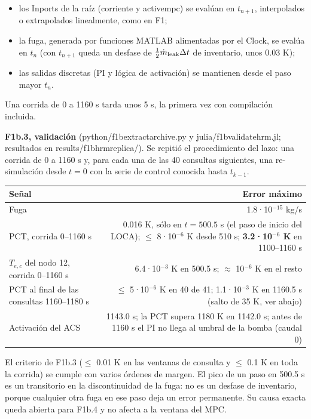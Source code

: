 \documentclass[11pt,a4paper]{article}
\newcommand{\codeus}{\textunderscore\allowbreak}
\newcommand{\code}[1]{{\small\ttfamily\let\_\codeus #1}}
\begin{document}
\begin{itemize}
\item los Inports de la raíz (corriente y \code{active\_mpc}) se evalúan en $t_{n+1}$, interpolados o extrapolados linealmente, como en F1;
\item la fuga, generada por funciones MATLAB alimentadas por el \code{Clock}, se evalúa en $t_n$ (con $t_{n+1}$ queda un desfase de $\tfrac12\dot m_{\rm leak}\Delta t$ de inventario, unos 0.03 K);
\item las salidas discretas (PI y lógica de activación) se mantienen desde el paso mayor $t_n$.
\end{itemize}

Una corrida de 0 a 1160 s tarda unos 5 s, la primera vez con compilación incluida.

\textbf{F1b.3, validación} (\code{python/f1b\_extract\_archive.py} y \code{julia/f1b\_validate\_hrm.jl}; resultados en \code{results/f1b\_hrm\_replica/}). Se repitió el procedimiento del lazo: una corrida de 0 a 1160 s y, para cada una de las 40 consultas siguientes, una re-simulación desde $t=0$ con la serie de control conocida hasta $t_{k-1}$.

{\small
\begin{xltabular}{\linewidth}{@{}YR@{}}
\toprule
\textbf{Señal} & \textbf{Error máximo} \\
\midrule
\endhead
Fuga & 1.8·10$^{-15}$ kg/s \\
PCT, corrida 0–1160 s & 0.016 K, sólo en $t=500.5$ s (el paso de inicio del LOCA); $\le$ 8·10$^{-6}$ K desde 510 s; \textbf{3.2·10$^{-6}$ K} en 1100–1160 s \\
$T_{e,c}$ del nodo 12, corrida 0–1160 s & 6.4·10$^{-3}$ K en 500.5 s; $\approx$ 10$^{-6}$ K en el resto \\
PCT al final de las consultas 1160–1180 s & $\le$ 5·10$^{-6}$ K en 40 de 41; 1.1·10$^{-3}$ K en 1160.5 s (salto de 35 K, ver abajo) \\
Activación del ACS & 1143.0 s; la PCT supera 1180 K en 1142.0 s; antes de 1160 s el PI no llega al umbral de la bomba (caudal 0) \\
\bottomrule
\end{xltabular}}

El criterio de F1b.3 ($\le$ 0.01 K en las ventanas de consulta y $\le$ 0.1 K en toda la corrida) se cumple con varios órdenes de margen. El pico de un paso en 500.5 s es un transitorio en la discontinuidad de la fuga: no es un desfase de inventario, porque cualquier otra fuga en ese paso deja un error permanente. Su causa exacta queda abierta para F1b.4 y no afecta a la ventana del MPC.
\end{document}
